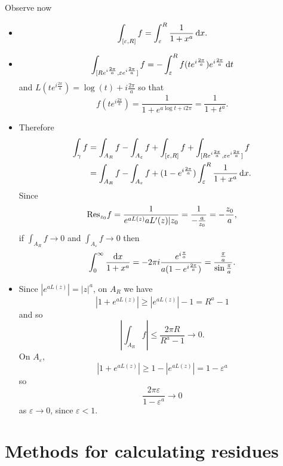 \begin{xmpl}
  Observe now
  \begin{itemize}
    \item{
      $$
        \int_{[\varepsilon, R]} f
      = \int_\varepsilon^R
          \frac{1}{1 + x^a}
          \mathop{}\!\mathrm{d} x.
      $$
    }
    \item{
      $$
         \int_{[R e^{i \frac{2\pi}{a}},
                \varepsilon e^{i \frac{2\pi}{a}}]}
           f
       = -\int_{\varepsilon}^R
            f(te^{i \frac{2\pi}{a}}) e^{i \frac{2\pi}{a}}
            \mathop{}\!\mathrm{d} t
      $$
      and $L(te^{i \frac{2\pi}{a}}) = \log(t) + i \frac{2\pi}{a}$
      so that
      $$
        f(t e^{i \frac{2 \pi}{a}})
      = \frac{1}{1 + e^{a \log t + i 2 \pi}}
      = \frac{1}{1 + t^a}.
      $$
    }
    \item{
      Therefore
      \begin{align*}
          \int_{\gamma} f
       &= \int_{A_R} f
        - \int_{A_\varepsilon} f
        + \int_{[\varepsilon, R]} f
        + \int_{[R e^{i \frac{2\pi}{a}},
                \varepsilon e^{i \frac{2 \pi}{a}}]}
             f \\
       &= \int_{A_R} f
        - \int_{A_\varepsilon} f
        + (1 - e^{i \frac{2\pi}{a}})
          \int_\varepsilon^R
            \frac{1}{1 + x^a}
            \mathop{}\!\mathrm{d} x.
      \end{align*}
      Since
      $$
          \mathrm{Res}_{z_0} f
        = \frac{1}
               {e^{a L(z)} a L^\prime(z)|z_0}
        = \frac{1}
               {-\frac{a}{z_0}} = -\frac{z_0}{a},
      $$
      if $\int_{A_R} f \to 0$ and $\int_{A_\varepsilon} f \to 0$
      then
      $$
        \int_0^\infty
          \frac{\mathop{}\!\mathrm{d} x}{1 + x^a}
      = -2 \pi i \frac{e^{i\frac{\pi}{a}}}
                      {a(1 - e^{i\frac{2\pi}{a}})}
      = \frac{\frac{\pi}{a}}
             {\sin \frac{\pi}{a}}.
      $$
    }
    \item{
      Since $|e^{a L(z)}| = |z|^a$, on $A_R$ we have
      $$
      |1 + e^{a L(z)}| \geq |e^{a L(z)}| - 1 = R^a - 1
      $$
      and so
      $$
           \left|
             \int_{A_R} f
           \right|
      \leq \frac{2 \pi R}{R^a - 1}
      \to  0.
      $$
      On $A_\varepsilon$,
      $$
      |1 + e^{a L(z)}| \geq 1 - |e^{a L(z)}| = 1 - \varepsilon^a
      $$
      so
      $$
      \frac{2 \pi \varepsilon}{1 - \varepsilon^a} \to 0
      $$
      as $\varepsilon \to 0$, since $\varepsilon < 1$.
    }
  \end{itemize}
\end{xmpl}

\section{Methods for calculating residues}

